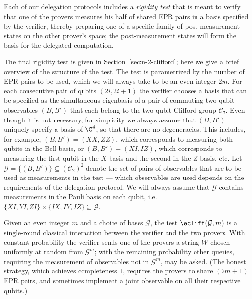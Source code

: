 
Each of our delegation protocols includes a \emph{rigidity test} that is meant to verify that one of the provers measures his half of shared EPR pairs in a basis specified by the verifier, thereby preparing one of a specific family of post-measurement states on the other prover's space; the post-measurement states will form the basis for the delegated computation. 

The final rigidity test is given in Section~\ref{sec:n-2-clifford}; here we give a brief overview of the structure of the test. The test is parametrized by the number of EPR pairs to be used, which we will always take to be an even integer $2m$. For each consecutive pair of qubits $(2i,2i+1)$ the verifier chooses a basis  that can be specified as the simultaneous eigenbasis of a pair of commuting two-qubit observables $(B,B')$ that each belong to the two-qubit Clifford group $\mathcal{C}_2$. Even though it is not necessary, for simplicity we always assume that $(B,B')$ uniquely specify a basis of $\C^4$, so that there are no degeneracies. This includes, for example, $(B,B')=(XX,ZZ)$, which corresponds to measuring both qubits in the Bell basis, or $(B,B')=(XI,IZ)$, which corresponds to measuring the first qubit in the $X$ basis and the second in the $Z$ basis, etc. Let $\mathcal{G} = \{ (B,B') \} \subseteq (\mathcal{C}_2)^2$ denote the set of pairs of observables that are to be used as measurements in the test --- which observables are used depends on the requirements of the delegation protocol. We will always assume that $\mathcal{G}$ contains measurements in the Pauli basis on each qubit, i.e.\ \mbox{$\{XI,YI,ZI\}\times\{IX,IY,IZ\} \subseteq \mathcal{G}$}. 

Given an even integer $m$ and a choice of bases $\mathcal{G}$, the test $\ecliff(\mathcal{G},m)$ is a single-round classical interaction between the verifier and the two provers. With constant probability the verifier sends one of the provers a string $W$ chosen uniformly at random from $\mathcal{G}^m$; with the remaining probability other queries, requiring the measurement of observables not in $\mathcal{G}^m$, may be asked. (The honest strategy, which achieves completeness $1$, requires the provers to share $(2m+1)$ EPR pairs, and sometimes implement a joint observable on all their respective qubits.) %

